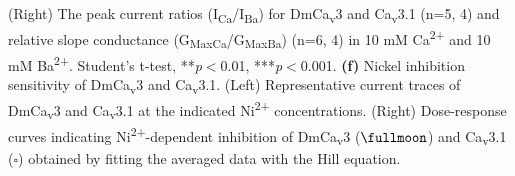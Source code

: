 (Right) The peak current ratios (I\textsubscript{Ca}/I\textsubscript{Ba}) for DmCa\textsubscript{v}3 and Ca\textsubscript{v}3.1 (n=5, 4) and relative slope conductance (G\textsubscript{MaxCa}/G\textsubscript{MaxBa}) (n=6, 4) in 10 mM Ca\textsuperscript{2+} and 10 mM Ba\textsuperscript{2+}.
Student's t-test, **\emph{p}$<$0.01, ***\emph{p}$<$0.001.
\textbf{(f)} Nickel inhibition sensitivity of DmCa\textsubscript{v}3 and Ca\textsubscript{v}3.1. 
(Left) Representative current traces of DmCa\textsubscript{v}3 and Ca\textsubscript{v}3.1 at the indicated Ni\textsuperscript{2+} concentrations. 
(Right) Dose-response curves indicating Ni\textsuperscript{2+}-dependent inhibition of DmCa\textsubscript{v}3 ($\fullmoon$) and Ca\textsubscript{v}3.1 ($\square$) obtained by fitting the averaged data with the Hill equation.
